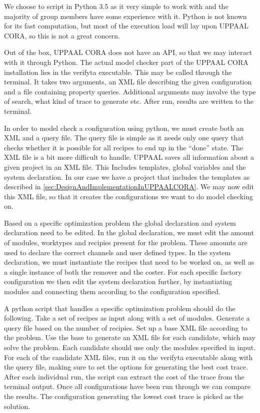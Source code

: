 We choose to script in Python 3.5 as it very simple to work with and the majority of group members have some experience with it. Python is not known for its fast computation, but most of the execution load will lay upon UPPAAL CORA, so this is not a great concern. 


Out of the box, UPPAAL CORA does not have an API, so that we may interact with it through Python. The actual model checker part of the UPPAAL CORA installation lies in the verifyta executable. This may be called through the terminal. It takes two arguments, an XML file describing the given configuration and a file containing property queries. Additional arguments may involve the type of search, what kind of trace to generate etc. After run, results are written to the terminal. 


In order to model check a configuration using python, we must create both an XML and a query file. The query file is simple as it needs only one query that checks whether it is possible for all recipes to end up in the “done” state. The XML file is a bit more difficult to handle. UPPAAL saves all information about a given project in an XML file. This Includes templates, global variables and the system declaration. In our case we have a project that includes the templates as described in \cref{sec:DesignAndImplementationInUPPAALCORA}. We may now edit this XML file, so that it creates the configurations we want to do model checking on.

Based on a specific optimization problem the global declaration and system declaration need to be edited. In the global declaration, we must edit the amount of modules, worktypes and recipies present for the problem. These amounts are used to declare the correct channels and user defined types. In the system declaration, we must instantiate the recipes that need to be worked on, as well as a single instance of both the remover and the coster. For each specific factory configuration we then edit the system declaration further, by instantiating modules and connecting them according to the configuration specified. 


A python script that handles a specific optimization problem should do the following. Take a set of recipes as input along with a set of modules. Generate a query file based on the number of recipies. Set up a base XML file according to the problem. Use the base to generate an XML file for each candidate, which may solve the problem. Each candidate should use only the modules specified in input. For each of the candidate XML files, run it on the verifyta executable along with the query file, making sure to set the options for generating the best cost trace. After each individual run, the script can extract the cost of the trace from the terminal output. Once all configurations have been run through we can compare the results. The configuration generating the lowest cost trace is picked as the solution. 


